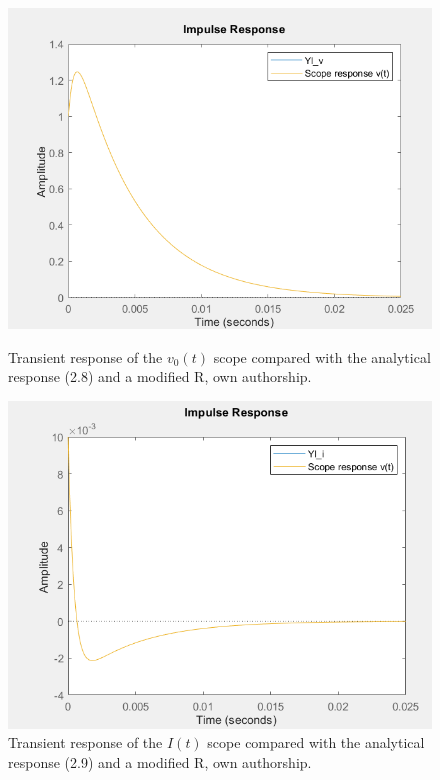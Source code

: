 \documentclass[a4paper,12pt]{article}
\begin{document}
\begin{figure}[H]
    \centering
    \begin{minipage}[b]{0.45\linewidth}
        \centering
        \includegraphics[width=\linewidth]{scopeanalyticalmodifiedv.png}
        \caption{Transient response of the $v_0(t)$ scope compared with the analytical response (2.8) and a modified R, own authorship.}
        \label{fig:scopeanalyticalmodifiedv}
    \end{minipage}
    \hspace{0.05\linewidth} %
    \begin{minipage}[b]{0.45\linewidth}
        \centering
        \includegraphics[width=\linewidth]{scopeanalyticalmodifiedi.png}
        \caption{Transient response of the $I(t)$ scope compared with the analytical response (2.9) and a modified R, own authorship.}
        \label{fig:scopeanalyticalmodifiedi}
    \end{minipage}
\end{figure}
\end{document}
